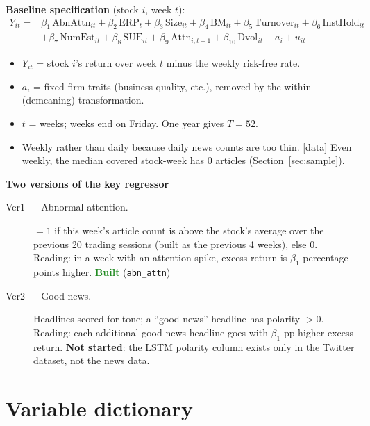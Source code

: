 \documentclass[11pt]{article}
\newcommand{\done}{\textcolor{ForestGreen}{\textbf{Built}}}
\newcommand{\todo}{\textcolor{BrickRed}{\textbf{Not started}}}
\newcommand{\data}{\textcolor{NavyBlue}{\textsf{[data]}}}
\newcommand{\var}[1]{\texttt{#1}}
\begin{document}
\textbf{Baseline specification} (stock $i$, week $t$):
\begin{align*}
Y_{it} = {}& \beta_1\,\text{AbnAttn}_{it} + \beta_2\,\text{ERP}_t + \beta_3\,\text{Size}_{it} + \beta_4\,\text{BM}_{it}
 + \beta_5\,\text{Turnover}_{it} + \beta_6\,\text{InstHold}_{it} \\
 &+ \beta_7\,\text{NumEst}_{it} + \beta_8\,\text{SUE}_{it} + \beta_9\,\text{Attn}_{i,t-1} + \beta_{10}\,\text{Dvol}_{it} + a_i + u_{it}
\end{align*}
\begin{itemize}
  \item $Y_{it}$ = stock $i$'s return over week $t$ minus the weekly risk-free rate.
  \item $a_i$ = fixed firm traits (business quality, etc.), removed by the within (demeaning) transformation.
  \item $t$ = weeks; weeks end on Friday. One year gives $T=52$.
  \item Weekly rather than daily because daily news counts are too thin. \data{} Even weekly, the median covered stock-week has 0 articles (Section~\ref{sec:sample}).
\end{itemize}

\textbf{Two versions of the key regressor}
\begin{description}
  \item[Ver1 --- Abnormal attention.] $=1$ if this week's article count is above the stock's average over the previous 20 trading sessions (built as the previous 4 weeks), else 0. Reading: in a week with an attention spike, excess return is $\beta_1$ percentage points higher. \done{} (\var{abn\_attn})
  \item[Ver2 --- Good news.] Headlines scored for tone; a ``good news'' headline has polarity $>0$. Reading: each additional good-news headline goes with $\beta_1$ pp higher excess return. \todo{}: the LSTM polarity column exists only in the Twitter dataset, not the news data.
\end{description}

\section{Variable dictionary}
\end{document}
